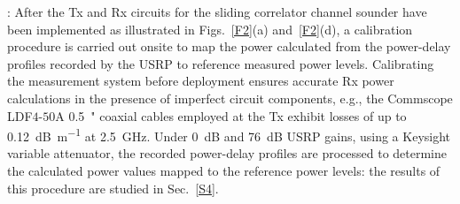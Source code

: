 \documentclass[12pt, draftcls, onecolumn]{IEEEtran}
\begin{document}
: After the Tx and Rx circuits for the sliding correlator channel sounder have been implemented as illustrated in Figs.~\ref{F2}(a) and~\ref{F2}(d), a calibration procedure is carried out onsite to map the power calculated from the power-delay profiles recorded by the USRP to reference measured power levels. Calibrating the measurement system before deployment ensures accurate Rx power calculations in the presence of imperfect circuit components, e.g., the Commscope LDF$4$-$50$A \SI{0.5}{{"}} coaxial cables employed at the Tx exhibit losses of up to \SI{0.12}{\deci\bel\per\meter} at \SI{2.5}{\giga\hertz}. Under \SI{0}{\deci\bel} and \SI{76}{\deci\bel} USRP gains, using a Keysight variable attenuator, the recorded power-delay profiles are processed to determine the calculated power values mapped to the reference power levels: the results of this procedure are studied in Sec.~\ref{S4}.
\end{document}
